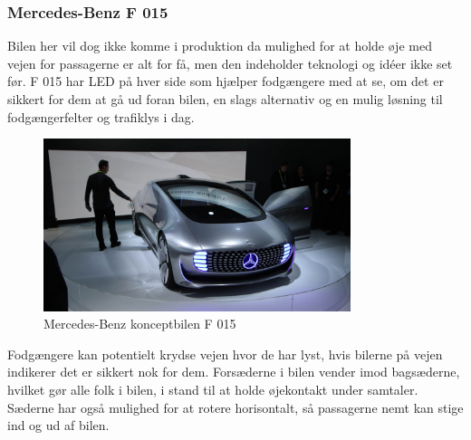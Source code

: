 \subsubsection{Mercedes-Benz F 015}
Bilen her vil dog ikke komme i produktion da mulighed for at holde øje med vejen for passagerne er alt for få, men den indeholder teknologi og idéer ikke set før. F 015 har LED på hver side som hjælper fodgængere med at se, om det er sikkert for dem at gå ud foran bilen, en slags alternativ og en mulig løsning til fodgængerfelter og trafiklys i dag.
\begin{figure}[h!]
	\centering
	\includegraphics[width=0.8\textwidth]{images/150106_0422_ces.jpg}
	\caption{Mercedes-Benz konceptbilen F 015}
	\label{fig:Mercedes-Benz_F_015}
\end{figure}
Fodgængere kan potentielt krydse vejen hvor de har lyst, hvis bilerne på vejen indikerer det er sikkert nok for dem. Forsæderne i bilen vender imod bagsæderne, hvilket gør alle folk i bilen, i stand til at holde øjekontakt under samtaler. Sæderne har også mulighed for at rotere horisontalt, så passagerne nemt kan stige ind og ud af bilen.
